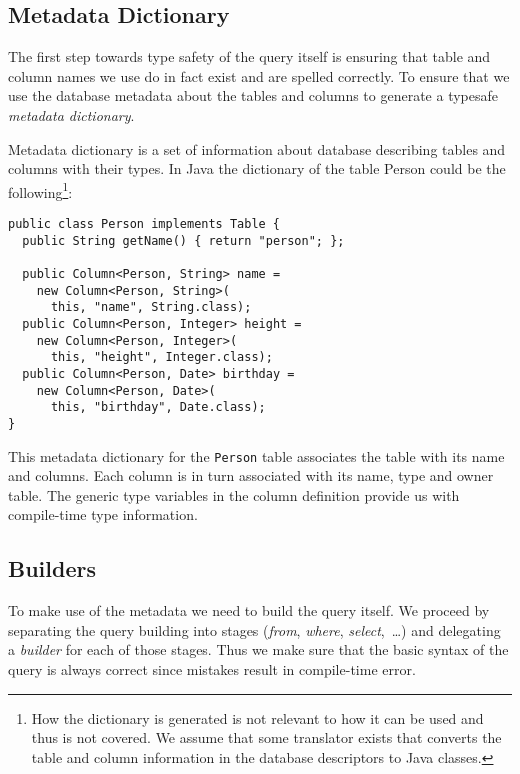 \documentclass{sig-alternate}
\begin{document}
\subsection{Metadata Dictionary}

The first step towards type safety of the query itself is ensuring that table and column names we use do in fact exist and are spelled correctly. To ensure that we use the database metadata about the tables and columns to generate a typesafe \emph{metadata dictionary}.

Metadata dictionary is a set of information about database describing tables and columns with their types. In Java the dictionary of the table Person could be the following\footnote{How the dictionary is generated is not relevant to how it can be used and thus is not covered. We assume that some translator exists that converts the table and column information in the database descriptors to Java classes.}:

\begin{verbatim}
public class Person implements Table {
  public String getName() { return "person"; };

  public Column<Person, String> name = 
    new Column<Person, String>(
      this, "name", String.class);
  public Column<Person, Integer> height = 
    new Column<Person, Integer>(
      this, "height", Integer.class);
  public Column<Person, Date> birthday = 
    new Column<Person, Date>(
      this, "birthday", Date.class);
}
\end{verbatim}

This metadata dictionary for the \verb!Person! table associates the table with
its name and columns. Each column is in turn associated with its name, type and
owner table. The generic type variables in the column definition provide us
with compile-time type information.

\subsection{Builders}

To make use of the metadata we need to build the query itself. We proceed by separating the query building into stages (\emph{from}, \emph{where}, \emph{select},~\ldots) and delegating a \emph{builder} for each of those stages. Thus we make sure that the basic syntax of the query is always correct since mistakes result in compile-time error.
\end{document}
